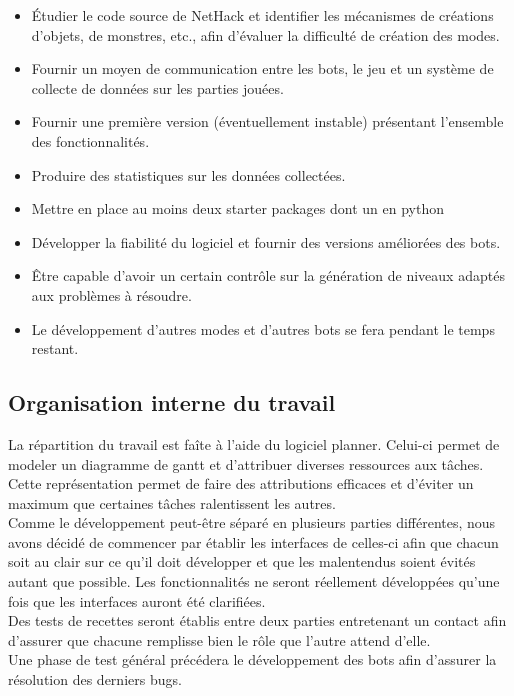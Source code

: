\documentclass[12pt]{article}
\begin{document}
\begin{itemize}
\item Étudier le code source de NetHack et identifier les mécanismes de créations d'objets, de monstres, etc., afin d'évaluer la difficulté de création des modes.
\item Fournir un moyen de communication entre les bots, le jeu et un système de collecte de données sur les parties jouées.
\item Fournir une première version (éventuellement instable) présentant l'ensemble des fonctionnalités.
\item Produire des statistiques sur les données collectées.
\item Mettre en place au moins deux starter packages dont un en python
\item Développer la fiabilité du logiciel et fournir des versions améliorées des bots.
\item Être capable d'avoir un certain contrôle sur la génération de niveaux adaptés aux problèmes à résoudre.
\item Le développement d'autres modes et d'autres bots se fera pendant le temps restant.
\end{itemize}

\subsection{Organisation interne du travail}

La répartition du travail est faîte à l'aide du logiciel planner. Celui-ci
permet de modeler un diagramme de gantt et d'attribuer diverses ressources aux
tâches. Cette représentation permet de faire des attributions efficaces et
d'éviter un maximum que certaines tâches ralentissent les autres.\\

Comme le développement peut-être séparé en plusieurs parties différentes, nous
avons décidé de commencer par établir les interfaces de celles-ci afin que
chacun soit au clair sur ce qu'il doit développer et que les malentendus soient
évités autant que possible. Les fonctionnalités ne seront réellement développées
qu'une fois que les interfaces auront été clarifiées.\\

Des tests de recettes seront établis entre deux parties entretenant un contact
afin d'assurer que chacune remplisse bien le rôle que l'autre attend d'elle.\\

Une phase de test général précédera le développement des bots afin d'assurer la
résolution des derniers bugs.\\
\end{document}
